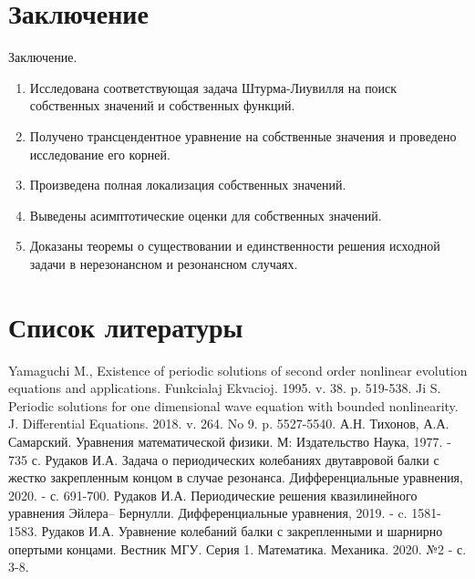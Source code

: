 \documentclass[ignorenonframetext,unicode,handout, 9pt]{beamer}
\numberwithin{equation}{section}
\begin{document}

\section{Заключение}

\begin{frame}{Заключение.}

\begin{enumerate}
  \item Исследована соответствующая задача Штурма-Лиувилля на поиск собственных значений и собственных функций.
  \item Получено трансцендентное уравнение на собственные значения и проведено исследование его корней.
  \item Произведена полная локализация собственных значений.
  \item Выведены асимптотические оценки для собственных значений.
  \item Доказаны теоремы о существовании и единственности решения исходной задачи в нерезонансном и резонансном случаях.
\end{enumerate}

\end{frame}



\section{Список литературы}

\begin{frame}

\begin{thebibliography}{9}

Yamaguchi M., Existence of periodic solutions of second order nonlinear evolution equations and applications. Funkcialaj Ekvacioj. 1995. v. 38. p. 519-538.
Ji S. Periodic solutions for one dimensional wave equation with bounded nonlinearity. J. Differential Equations. 2018. v. 264. No 9. p. 5527-5540.
 А.Н. Тихонов, А.А. Самарский. Уравнения математической физики. М: Издательство Наука, 1977. -  735 с.
Рудаков И.А. Задача о периодических колебаниях двутавровой балки с  жестко закрепленным концом в случае резонанса. Дифференциальные уравнения, 2020. -  с. 691-700.
Рудаков И.А. Периодические решения квазилинейного уравнения Эйлера– Бернулли. Дифференциальные уравнения, 2019. - c. 1581-1583.
Рудаков И.А. Уравнение колебаний балки с закрепленными и шарнирно опертыми концами. Вестник МГУ. Серия 1. Математика. Механика. 2020. №2 - с. 3-8.


\end{thebibliography}

\end{frame}

\end{document}
